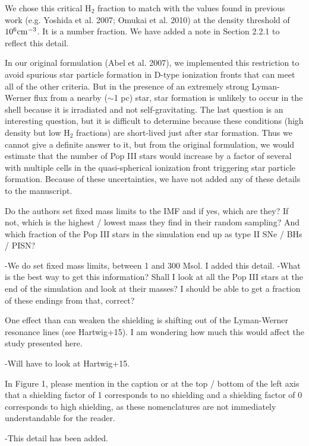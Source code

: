 \documentclass[11pt]{article}
\newenvironment{referee}[1][]{%
    \ignorespaces%
    \begin{mdframed}[style=myquotestyle,#1]%
}{%
    \end{mdframed}%
    \ignorespacesafterend%
}%
\begin{document}
We chose this critical H$_2$ fraction to match with the values found in previous work (e.g. Yoshida et al. 2007; Omukai et al. 2010) at the density threshold of $10^6 \cubecm$.  It is a number fraction.  We have added a note in Section 2.2.1 to reflect this detail.

In our original formulation (Abel et al. 2007), we implemented this restriction to avoid spurious star particle formation in D-type ionization fronts that can meet all of the other criteria.  But in the presence of an extremely strong Lyman-Werner flux from a nearby ($\sim$1 pc) star, star formation is unlikely to occur in the shell because it is irradiated and not self-gravitating. The last question is an interesting question, but it is difficult to determine because these conditions (high density but low H$_2$ fractions) are short-lived just after star formation.  Thus we cannot give a definite answer to it, but from the original formulation, we would estimate that the number of Pop III stars would increase by a factor of several with multiple cells in the quasi-spherical ionization front triggering star particle formation.  Because of these uncertainties, we have not added any of these details to the manuscript.

\begin{referee}
Do the authors set fixed mass limits to the IMF and if yes, which are they?  If not, which is the highest / lowest mass they find in their random sampling?  And which fraction of the Pop III stars in the simulation end up as type II SNe / BHs / PISN?
\end{referee}
-We do set fixed mass limits, between 1 and 300 Msol. I added this detail. 
-What is the best way to get this information? Shall I look at all the Pop III stars at the end of the simulation and look at their masses? I should be able to get a fraction of these endings from that, correct?

\begin{referee}
One effect than can weaken the shielding is shifting out of the Lyman-Werner resonance lines (see Hartwig+15). I am wondering how much this would affect the study presented here.
\end{referee}
-Will have to look at Hartwig+15. 

\begin{referee}
In Figure 1, please mention in the caption or at the top / bottom of the left axis that a shielding factor of 1 corresponds to no shielding and a shielding factor of 0 corresponds to high shielding, as these nomenclatures are not immediately understandable for the reader.
\end{referee}
-This detail has been added. 
\end{document}
